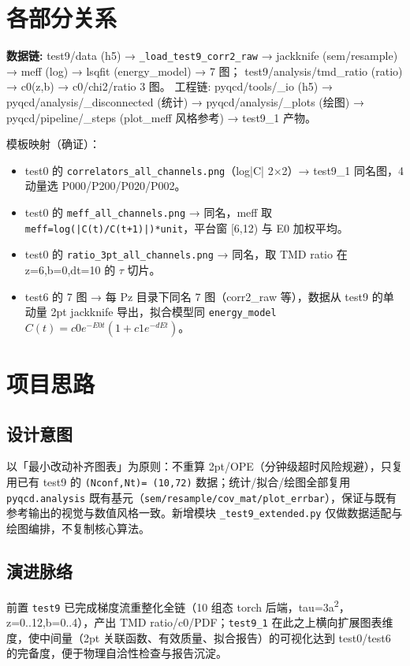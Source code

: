 \documentclass[UTF8]{ctexart}
\begin{document}
\section{各部分关系}
\begin{keybox}
\textbf{数据链:} \textcolor{relation}{test9/data (h5) → \nolinkurl{_load_test9_corr2_raw} → jackknife (sem/resample) → meff (log) → lsqfit (energy\_model) → 7 图；}
\textcolor{relation}{test9/analysis/tmd\_ratio (ratio) → c0(z,b) → c0/chi2/ratio 3 图。}
工程链: \textcolor{relation}{pyqcd/tools/\_io (h5) → pyqcd/analysis/\_disconnected (统计) → pyqcd/analysis/\_plots (绘图) → pyqcd/pipeline/\_steps (plot\_meff 风格参考) → test9\_1 产物。}
\end{keybox}

模板映射（确证）：
\begin{itemize}
\item test0 的 \texttt{correlators\_all\_channels.png}（log|C| 2×2）→ test9\_1 同名图，4 动量选 P000/P200/P020/P002。
\item test0 的 \texttt{\nolinkurl{meff\_all\_channels.png}} → 同名，meff 取 \texttt{meff=log(|C(t)/C(t+1)|)*unit}，平台窗 [6,12) 与 E0 加权平均。
\item test0 的 \texttt{\nolinkurl{ratio\_3pt\_all\_channels.png}} → 同名，取 TMD ratio 在 z=6,b=0,dt=10 的 $\tau$ 切片。
\item test6 的 7 图 → 每 Pz 目录下同名 7 图（corr2\_raw 等），数据从 test9 的单动量 2pt jackknife 导出，拟合模型同 \texttt{energy\_model} $C(t)=c0 e^{-E0 t}(1+c1 e^{-dE t})$。
\end{itemize}

\section{项目思路}
\subsection{设计意图}
以「最小改动补齐图表」为原则：不重算 2pt/OPE（分钟级超时风险规避），只复用已有 test9 的 \texttt{(Nconf,Nt)= (10,72)} 数据；统计/拟合/绘图全部复用 \texttt{pyqcd.analysis} 既有基元（\texttt{sem/resample/cov\_mat/plot\_errbar}），保证与既有参考输出的视觉与数值风格一致。新增模块 \texttt{\_test9\_extended.py} 仅做数据适配与绘图编排，不复制核心算法。

\subsection{演进脉络}
前置 \texttt{test9} 已完成梯度流重整化全链（10 组态 torch 后端，tau=3a\textsuperscript{2}，z=0..12,b=0..4），产出 TMD ratio/c0/PDF；\texttt{test9\_1} 在此之上横向扩展图表维度，使中间量（2pt 关联函数、有效质量、拟合报告）的可视化达到 test0/test6 的完备度，便于物理自洽性检查与报告沉淀。
\end{document}
